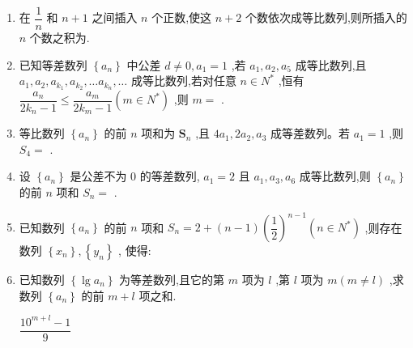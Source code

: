 \begin{enumerate}
    \item 在 $\dfrac{1}{n}$ 和 $n + 1$ 之间插入 $n$ 个正数,使这 $n + 2$ 个数依次成等比数列,则所插入的 $n$ 个数之积为.

     \item 已知等差数列 $\left\{  {a}_{n}\right\}$ 中公差 $d \neq  0,{a}_{1} = 1$ ,若 ${a}_{1},{a}_{2},{a}_{5}$ 成等比数列,且 ${a}_{1},{a}_{2},{a}_{{k}_{1}},{a}_{{k}_{2}},\ldots {a}_{{k}_{n}},\ldots$ 成等比数列,若对任意 $n \in  {N}^{ * }$ ,恒有 $\dfrac{{a}_{n}}{2{k}_{n} - 1} \leq  \dfrac{{a}_{m}}{2{k}_{m} - 1}\left( {m \in  {N}^{ * }}\right)$ ,则 $m =$ .

    \item 等比数列 $\left\{  {a}_{n}\right\}$ 的前 $n$ 项和为 ${\mathbf{S}}_{n}$ ,且 $4{a}_{1},2{a}_{2},{a}_{3}$ 成等差数列。若 ${a}_{1} = 1$ ,则 ${S}_{4} =$ .


    \item 设 $\left\{  {a}_{n}\right\}$ 是公差不为 0 的等差数列, ${a}_{1} = 2$ 且 ${a}_{1},{a}_{3},{a}_{6}$ 成等比数列,则 $\left\{  {a}_{n}\right\}$ 的前 $n$ 项和 ${S}_{n} =$      
     .

    \item 已知数列 $\left\{  {a}_{n}\right\}$ 的前 $n$ 项和 ${S}_{n} = 2 + \left( {n - 1}\right) {\left( \dfrac{1}{2}\right) }^{n - 1}\left( {n \in  {N}^{ * }}\right)$ ,则存在数列 $\left\{  {x}_{n}\right\}  ,\left\{  {y}_{n}\right\}$ , 使得:      

    \item 已知数列 $\left\{  {\lg {a}_{n}}\right\}$ 为等差数列,且它的第 $m$ 项为 $l$ ,第 $l$ 项为 $m\left( {m \neq  l}\right)$ ,求数列 $\left\{  {a}_{n}\right\}$ 的前 $m + l$ 项之和.
    \begin{jieda}
        $\dfrac{10^{m+l} - 1}{9}$
    \end{jieda}



\end{enumerate}
